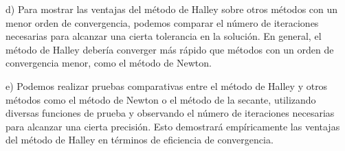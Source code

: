 \documentclass[a4paper,12pt]{article}
\begin{document}
d) Para mostrar las ventajas del método de Halley sobre otros métodos con un menor orden de convergencia, podemos comparar el número de iteraciones necesarias para alcanzar una cierta tolerancia en la solución. En general, el método de Halley debería converger más rápido que métodos con un orden de convergencia menor, como el método de Newton.

e) Podemos realizar pruebas comparativas entre el método de Halley y otros métodos como el método de Newton o el método de la secante, utilizando diversas funciones de prueba y observando el número de iteraciones necesarias para alcanzar una cierta precisión. Esto demostrará empíricamente las ventajas del método de Halley en términos de eficiencia de convergencia.


\end{document}
